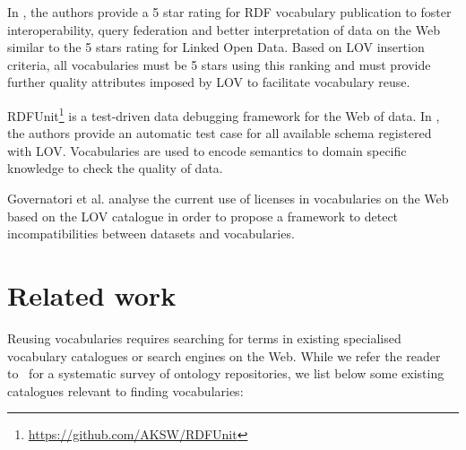 \documentclass{iosart2c}
\begin{document}
In \cite{janowicz2014five}, the authors provide a 5 star rating for RDF vocabulary publication to foster interoperability, query federation and better interpretation of data on the Web similar to the 5 stars rating for Linked Open Data. Based on LOV insertion criteria, all vocabularies must be 5 stars using this ranking and must provide further quality attributes imposed by LOV to facilitate vocabulary reuse.


RDFUnit\footnote{\url{https://github.com/AKSW/RDFUnit}} is a test-driven data debugging framework for the Web of data. In \cite{rdfunit}, the authors provide an automatic test case for all available schema registered with LOV. Vocabularies are used to encode semantics to domain specific knowledge to check the quality of data.

Governatori et al. \cite{governatori2014} analyse the current use of licenses in vocabularies on the Web based on the LOV catalogue in order to propose a framework to detect incompatibilities between datasets and vocabularies.


\section{Related work}
\label{sec:related}
Reusing vocabularies requires searching for terms in existing specialised vocabulary catalogues or search engines on the Web. While we refer the reader to~\cite{AquinJoWS12} for a systematic survey of ontology repositories, we list below some existing catalogues relevant to finding vocabularies:  
\end{document}
